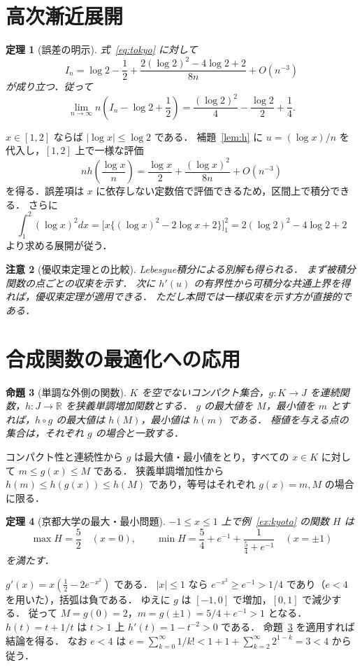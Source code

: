 \documentclass[a5paper,10pt,onecolumn]{jsarticle}
\makeatletter
\theoremstyle{mathnotetheorem}
\newtheorem{theorem}{定理}[section]
\newtheorem{proposition}[theorem]{命題}
\newtheorem{remark}[theorem]{注意}
\renewcommand{\proofname}{証明}
\renewenvironment{proof}[1][\proofname]{%
  \par\pushQED{\qed}\normalfont\topsep4\p@\@plus2\p@\relax
  \trivlist\item[\hskip\labelsep\bfseries #1]\ignorespaces
}{\popQED\endtrivlist\@endpefalse}
\makeatother
\begin{document}
\section{高次漸近展開}
\begin{theorem}[誤差の明示]\label{thm:asympt}
式~\eqref{eq:tokyo} に対して
\[
 I_n=\log2-\frac12
 +\frac{2(\log2)^2-4\log2+2}{8n}
 +O(n^{-3})
\]
が成り立つ．従って
\[
 \lim_{n\to\infty}n\left(I_n-\log2+\frac12\right)
 =\frac{(\log2)^2}{4}-\frac{\log2}{2}+\frac14.
\]
\end{theorem}
\begin{proof}
$x\in[1,2]$ ならば $|\log x|\le\log2$ である．
補題~\ref{lem:h} に $u=(\log x)/n$ を代入し，$[1,2]$ 上で一様な評価
\[
 n h\!\left(\frac{\log x}{n}\right)
 =\frac{\log x}{2}+\frac{(\log x)^2}{8n}+O(n^{-3})
\]
を得る．誤差項は $x$ に依存しない定数倍で評価できるため，区間上で積分できる．
さらに
\[
 \int_1^2(\log x)^2dx
 =\bigl[x\{(\log x)^2-2\log x+2\}\bigr]_1^2
 =2(\log2)^2-4\log2+2
\]
より求める展開が従う．
\end{proof}

\begin{remark}[優収束定理との比較]
Lebesgue積分による別解も得られる．
まず被積分関数の点ごとの収束を示す．
次に $h'(u)$ の有界性から可積分な共通上界を得れば，優収束定理が適用できる．
ただし本問では一様収束を示す方が直接的である．
\end{remark}

\section{合成関数の最適化への応用}
\begin{proposition}[単調な外側の関数]\label{prop:composition}
$K$ を空でないコンパクト集合，$g:K\to J$ を連続関数，$h:J\to\mathbb R$ を狭義単調増加関数とする．
$g$ の最大値を $M$，最小値を $m$ とすれば，$h\circ g$ の最大値は $h(M)$，最小値は $h(m)$ である．
極値を与える点の集合は，それぞれ $g$ の場合と一致する．
\end{proposition}
\begin{proof}
コンパクト性と連続性から $g$ は最大値・最小値をとり，すべての $x\in K$ に対して $m\le g(x)\le M$ である．
狭義単調増加性から $h(m)\le h(g(x))\le h(M)$ であり，等号はそれぞれ $g(x)=m,M$ の場合に限る．
\end{proof}

\begin{theorem}[京都大学の最大・最小問題]\label{thm:kyoto}
$-1\le x\le1$ 上で例~\ref{ex:kyoto} の関数 $H$ は
\[
 \max H=\frac52\quad(x=0),\qquad
 \min H=\frac54+e^{-1}+\frac1{\frac54+e^{-1}}
 \quad(x=\pm1)
\]
を満たす．
\end{theorem}
\begin{proof}
$g'(x)=x(\tfrac12-2e^{-x^2})$ である．
$|x|\le1$ なら $e^{-x^2}\ge e^{-1}>1/4$ であり（$e<4$ を用いた），括弧は負である．
ゆえに $g$ は $[-1,0]$ で増加，$[0,1]$ で減少する．
従って $M=g(0)=2$，$m=g(\pm1)=5/4+e^{-1}>1$ となる．
$h(t)=t+1/t$ は $t>1$ 上 $h'(t)=1-t^{-2}>0$ である．
命題~\ref{prop:composition} を適用すれば結論を得る．
なお $e<4$ は $e=\sum_{k=0}^\infty1/k!<1+1+\sum_{k=2}^\infty2^{1-k}=3<4$ から従う．
\end{proof}
\end{document}
